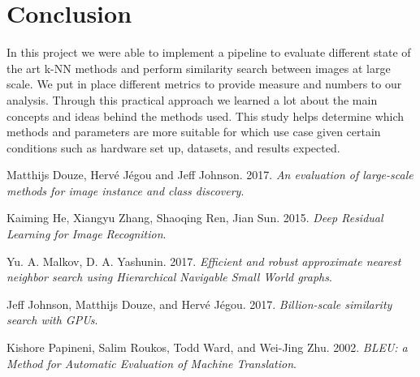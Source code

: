 \documentclass[a4paper]{article}
\begin{document}
\section*{Conclusion}

In this project we were able to implement a pipeline to evaluate different state of the art k-NN methods and perform similarity search between images at large scale. We put in place different metrics to provide measure and numbers to our analysis. Through this practical approach we learned a lot about the main concepts and ideas behind the methods used. This study helps determine which methods and parameters are more suitable for which use case given certain conditions such as hardware set up, datasets, and results expected.

\begin{thebibliography}{5}

Matthijs Douze, Hervé Jégou and Jeff Johnson. 2017.
\textit{An evaluation of large-scale methods for image instance and class discovery}.

Kaiming He, Xiangyu Zhang, Shaoqing Ren, Jian Sun. 2015.
\textit{Deep Residual Learning for Image Recognition}.

Yu. A. Malkov, D. A. Yashunin. 2017.
\textit{Efficient and robust approximate nearest neighbor search using Hierarchical Navigable Small World graphs}.

Jeff Johnson, Matthijs Douze, and Hervé Jégou. 2017.
\textit{Billion-scale similarity search with GPUs}. 

Kishore Papineni, Salim Roukos, Todd Ward, and Wei-Jing Zhu. 2002.
\textit{BLEU: a Method for Automatic Evaluation of Machine Translation}. 


\end{thebibliography}
\end{document}
